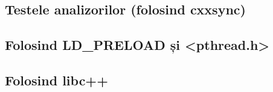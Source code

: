 \subsection{Testele analizorilor (folosind cxxsync)}
\subsection{Folosind LD\_PRELOAD și <pthread.h>}
\subsection{Folosind libc++}
